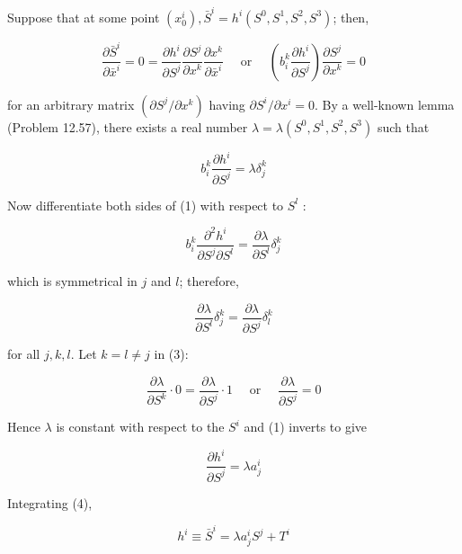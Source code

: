 \documentclass[10pt]{article}
\begin{document}
Suppose that at some point $\left(x_{0}^{i}\right), \bar{S}^{i}=h^{i}\left(S^{0}, S^{1}, S^{2}, S^{3}\right)$; then,

$$
\frac{\partial \bar{S}^{i}}{\partial \bar{x}^{i}}=0=\frac{\partial h^{i}}{\partial S^{j}} \frac{\partial S^{j}}{\partial x^{k}} \frac{\partial x^{k}}{\partial \bar{x}^{i}} \quad \text { or } \quad\left(b_{i}^{k} \frac{\partial h^{i}}{\partial S^{j}}\right) \frac{\partial S^{j}}{\partial x^{k}}=0
$$

for an arbitrary matrix $\left(\partial S^{j} / \partial x^{k}\right)$ having $\partial S^{i} / \partial x^{i}=0$. By a well-known lemma (Problem 12.57), there exists a real number $\lambda=\lambda\left(S^{0}, S^{1}, S^{2}, S^{3}\right)$ such that


\begin{equation*}
b_{i}^{k} \frac{\partial h^{i}}{\partial S^{j}}=\lambda \delta_{j}^{k} \tag{1}
\end{equation*}


Now differentiate both sides of (1) with respect to $S^{l}$ :


\begin{equation*}
b_{i}^{k} \frac{\partial^{2} h^{i}}{\partial S^{j} \partial S^{l}}=\frac{\partial \lambda}{\partial S^{l}} \delta_{j}^{k} \tag{2}
\end{equation*}


which is symmetrical in $j$ and $l$; therefore,


\begin{equation*}
\frac{\partial \lambda}{\partial S^{l}} \delta_{j}^{k}=\frac{\partial \lambda}{\partial S^{j}} \delta_{l}^{k} \tag{3}
\end{equation*}


for all $j, k, l$. Let $k=l \neq j$ in (3):

$$
\frac{\partial \lambda}{\partial S^{k}} \cdot 0=\frac{\partial \lambda}{\partial S^{j}} \cdot 1 \quad \text { or } \quad \frac{\partial \lambda}{\partial S^{j}}=0
$$

Hence $\lambda$ is constant with respect to the $S^{i}$ and (1) inverts to give


\begin{equation*}
\frac{\partial h^{i}}{\partial S^{j}}=\lambda a_{j}^{i} \tag{4}
\end{equation*}


Integrating (4),


\begin{equation*}
h^{i} \equiv \bar{S}^{i}=\lambda a_{j}^{i} S^{j}+T^{i} \tag{5}
\end{equation*}
\end{document}
